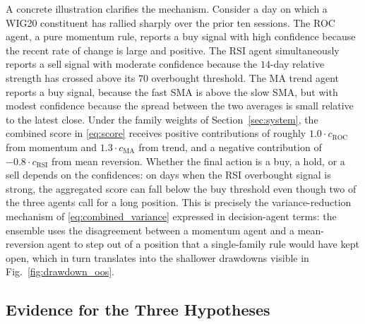 \documentclass{ieeeaccess}
\begin{document}
A concrete illustration clarifies the mechanism. Consider a day on which a WIG20 constituent has rallied sharply over the prior ten sessions. The ROC agent, a pure momentum rule, reports a buy signal with high confidence because the recent rate of change is large and positive. The RSI agent simultaneously reports a sell signal with moderate confidence because the $14$-day relative strength has crossed above its $70$ overbought threshold. The MA trend agent reports a buy signal, because the fast SMA is above the slow SMA, but with modest confidence because the spread between the two averages is small relative to the latest close. Under the family weights of Section~\ref{sec:system}, the combined score in \eqref{eq:score} receives positive contributions of roughly $1.0 \cdot c_\text{ROC}$ from momentum and $1.3 \cdot c_\text{MA}$ from trend, and a negative contribution of $-0.8 \cdot c_\text{RSI}$ from mean reversion. Whether the final action is a buy, a hold, or a sell depends on the confidences: on days when the RSI overbought signal is strong, the aggregated score can fall below the buy threshold even though two of the three agents call for a long position. This is precisely the variance-reduction mechanism of \eqref{eq:combined_variance} expressed in decision-agent terms: the ensemble uses the disagreement between a momentum agent and a mean-reversion agent to step out of a position that a single-family rule would have kept open, which in turn translates into the shallower drawdowns visible in Fig.~\ref{fig:drawdown_oos}.

\subsection{Evidence for the Three Hypotheses}
\end{document}
